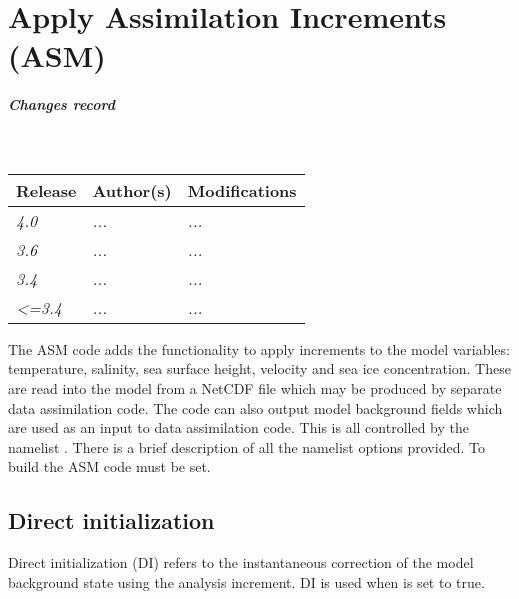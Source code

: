 \documentclass[../main/NEMO_manual]{subfiles}
\begin{document}
\chapter{Apply Assimilation Increments (ASM)}
\label{chap:ASM}


\thispagestyle{plain}

\chaptertoc

\paragraph{Changes record} ~\\

{\footnotesize
  \begin{tabularx}{\textwidth}{l||X|X}
    Release & Author(s) & Modifications \\
    \hline
    {\em   4.0} & {\em ...} & {\em ...} \\
    {\em   3.6} & {\em ...} & {\em ...} \\
    {\em   3.4} & {\em ...} & {\em ...} \\
    {\em <=3.4} & {\em ...} & {\em ...}
  \end{tabularx}
}

\clearpage

The ASM code adds the functionality to apply increments to the model variables: temperature, salinity,
sea surface height, velocity and sea ice concentration.
These are read into the model from a NetCDF file which may be produced by separate data assimilation code.
The code can also output model background fields which are used as an input to data assimilation code.
This is all controlled by the namelist .
There is a brief description of all the namelist options provided.
To build the ASM code  must be set.

\section{Direct initialization}
\label{sec:ASM_DI}

Direct initialization (DI) refers to the instantaneous correction of the model background state using
the analysis increment.
DI is used when  is set to true.
\end{document}
